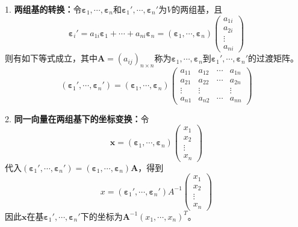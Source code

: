 1. \textbf{两组基的转换：}令$\boldsymbol{\varepsilon}_1,\cdots,\boldsymbol{\varepsilon}_n$和$\boldsymbol{\varepsilon}_1',\cdots,\boldsymbol{\varepsilon}_n'$为$V$的两组基，且
\begin{equation*}
    \boldsymbol{\varepsilon}_i' =a_{1i}\boldsymbol{\varepsilon}_1+\cdots+a_{ni}\boldsymbol{\varepsilon}_n=(\boldsymbol{\varepsilon}_1,\cdots,\boldsymbol{\varepsilon}_n)\begin{pmatrix}
        a_{1i}\\
        a_{2i}\\
        \vdots\\
        a_{ni}
    \end{pmatrix}
\end{equation*}
则有如下等式成立，其中$\boldsymbol{A}=(a_{ij})_{n\times n}$称为$\boldsymbol{\varepsilon}_1,\cdots,\boldsymbol{\varepsilon}_n$到$\boldsymbol{\varepsilon}_1',\cdots,\boldsymbol{\varepsilon}_n'$的过渡矩阵。
\begin{equation*}
    (\boldsymbol{\varepsilon}_1',\cdots,\boldsymbol{\varepsilon}_n')=(\boldsymbol{\varepsilon}_1,\cdots,\boldsymbol{\varepsilon}_n)\begin{pmatrix}
        a_{11}&a_{12}&\cdots&a_{1n}\\
        a_{21}&a_{22}&\cdots&a_{2n}\\
        \vdots&\vdots&&\vdots\\
        a_{n1}&a_{n2}&\cdots&a_{nn}
    \end{pmatrix}
\end{equation*}

2. \textbf{同一向量在两组基下的坐标变换：}令
\begin{equation*}
    \boldsymbol{x}=(\boldsymbol{\varepsilon}_1,\cdots,\boldsymbol{\varepsilon}_n)\begin{pmatrix}
        x_1\\
        x_2\\
        \vdots\\
        x_n
    \end{pmatrix}    
\end{equation*}
代入$(\boldsymbol{\varepsilon}_1',\cdots,\boldsymbol{\varepsilon}_n')=(\boldsymbol{\varepsilon}_1,\cdots,\boldsymbol{\varepsilon}_n)\boldsymbol{A}$，得到
\begin{equation*}
    x=(\boldsymbol{\varepsilon}_1',\cdots,\boldsymbol{\varepsilon}_n')A^{-1}\begin{pmatrix}
        x_1\\
        x_2\\
        \vdots\\
        x_n
    \end{pmatrix}
\end{equation*}
因此$\boldsymbol{x}$在基$\boldsymbol{\varepsilon}_1',\cdots,\boldsymbol{\varepsilon}_n'$下的坐标为$\boldsymbol{A}^{-1}(x_1,\cdots,x_n)^T$。

